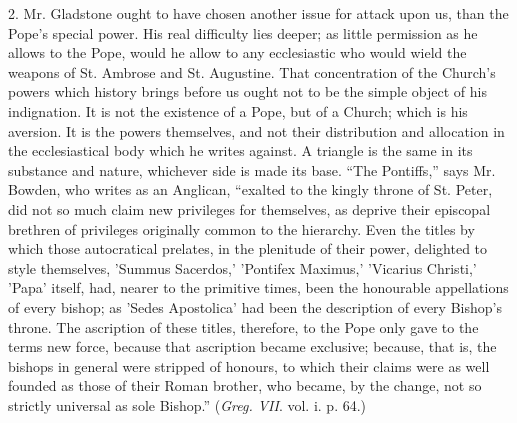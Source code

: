 2. Mr. Gladstone ought to have chosen another issue for attack upon
us, than the Pope's special power. His real difficulty lies deeper; as
little permission as he allows to the Pope, would he allow to any
ecclesiastic who would wield the weapons of St. Ambrose and St.
Augustine. That concentration of the Church's powers which history
brings before us ought not to be the simple object of his indignation.
It is not the existence of a Pope, but of a Church; which is his
aversion. It is the powers themselves, and not their distribution and
allocation in the ecclesiastical body which he writes against. A
triangle is the same in its substance and nature, whichever side is made
its base. ``The Pontiffs,'' says Mr. Bowden, who writes as an
Anglican, ``exalted to the kingly throne of St. Peter, did not so
much claim new privileges for themselves, as deprive their episcopal
brethren of privileges originally common to the hierarchy. Even the
titles by which those autocratical prelates, in the plenitude of their
power, delighted to style themselves, 'Summus Sacerdos,' 'Pontifex
Maximus,' 'Vicarius Christi,' 'Papa' itself, had, nearer to the
primitive times, been the honourable appellations of every bishop; as 'Sedes
Apostolica' had been the description of every Bishop's throne. The
ascription of these titles, therefore, to the Pope only gave to the
terms new force, because that ascription became exclusive; because, that
is, the bishops in general were stripped of honours, to which their
claims were as well founded as those of their Roman brother, who became,
by the change, not so strictly universal as sole Bishop.'' (\emph{Greg.
VII}. vol. i. p. 64.)

